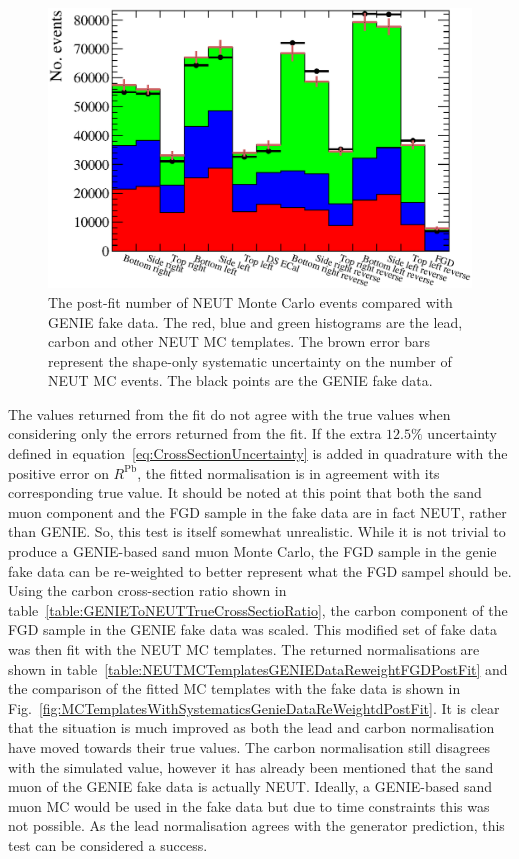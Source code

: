 \begin{figure}
  \centering
  \includegraphics[width=15cm]{images/measurement/validation/genie/MCTemplatesWithSystematics_GenieData_PostFit.eps}
  \caption{The post-fit number of NEUT Monte Carlo events compared with GENIE fake data.  The red, blue and green histograms are the lead, carbon and other NEUT MC templates.  The brown error bars represent the shape-only systematic uncertainty on the number of NEUT MC events.  The black points are the GENIE fake data.}
  \label{fig:MCTemplatesWithSystematicsGenieDataPostFit}
\end{figure}
The values returned from the fit do not agree with the true values when considering only the errors returned from the fit.  If the extra $12.5\%$ uncertainty defined in equation~\ref{eq:CrossSectionUncertainty} is added in quadrature with the positive error on $R^{\textrm{Pb}}$, the fitted normalisation is in agreement with its corresponding true value.  It should be noted at this point that both the sand muon component and the FGD sample in the fake data are in fact NEUT, rather than GENIE.  So, this test is itself somewhat unrealistic.  While it is not trivial to produce a GENIE-based sand muon Monte Carlo, the FGD sample in the genie fake data can be re-weighted to better represent what the FGD sampel should be.  Using the carbon cross-section ratio shown in table~\ref{table:GENIEToNEUTTrueCrossSectioRatio}, the carbon component of the FGD sample in the GENIE fake data was scaled.  This modified set of fake data was then fit with the NEUT MC templates.  The returned normalisations are shown in table~\ref{table:NEUTMCTemplatesGENIEDataReweightFGDPostFit} and the comparison of the fitted MC templates with the fake data is shown in Fig.~\ref{fig:MCTemplatesWithSystematicsGenieDataReWeightdPostFit}.  It is clear that the situation is much improved as both the lead and carbon normalisation have moved towards their true values.  The carbon normalisation still disagrees with the simulated value, however it has already been mentioned that the sand muon of the GENIE fake data is actually NEUT.  Ideally, a GENIE-based sand muon MC would be used in the fake data but due to time constraints this was not possible.  As the lead normalisation agrees with the generator prediction, this test can be considered a success.
